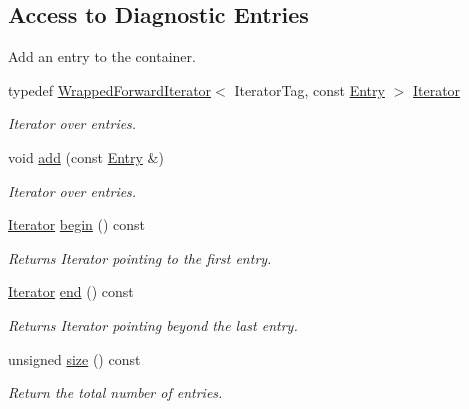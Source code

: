 \subsection*{Access to Diagnostic Entries}
\label{_amgrpb8b82e307fb357b7ea74808f49658af3}
 Add an entry to the container. \begin{DoxyCompactItemize}
\item 
typedef \hyperlink{classeos_1_1WrappedForwardIterator}{WrappedForwardIterator}$<$ IteratorTag, const \hyperlink{structeos_1_1Diagnostics_1_1Entry}{Entry} $>$ \hyperlink{classeos_1_1Diagnostics_a53e47703a0b60c37caf9cc2f29606692}{Iterator}
\begin{DoxyCompactList}\small\item\em Iterator over entries. \item\end{DoxyCompactList}\item 
void \hyperlink{classeos_1_1Diagnostics_a1c1e295724886603c8842e278ab62bbc}{add} (const \hyperlink{structeos_1_1Diagnostics_1_1Entry}{Entry} \&)
\begin{DoxyCompactList}\small\item\em Iterator over entries. \item\end{DoxyCompactList}\item 
\hyperlink{classeos_1_1WrappedForwardIterator}{Iterator} \hyperlink{classeos_1_1Diagnostics_a98edcfc773cbdf2384b6180cd1a8aebc}{begin} () const 
\begin{DoxyCompactList}\small\item\em Returns Iterator pointing to the first entry. \item\end{DoxyCompactList}\item 
\hyperlink{classeos_1_1WrappedForwardIterator}{Iterator} \hyperlink{classeos_1_1Diagnostics_a0e10cf2a79180f04b2d5c5100447ddb4}{end} () const 
\begin{DoxyCompactList}\small\item\em Returns Iterator pointing beyond the last entry. \item\end{DoxyCompactList}\item 
unsigned \hyperlink{classeos_1_1Diagnostics_a791a35a96b5661232ca9797e7a48c5e8}{size} () const 
\begin{DoxyCompactList}\small\item\em Return the total number of entries. \item\end{DoxyCompactList}\end{DoxyCompactItemize}


